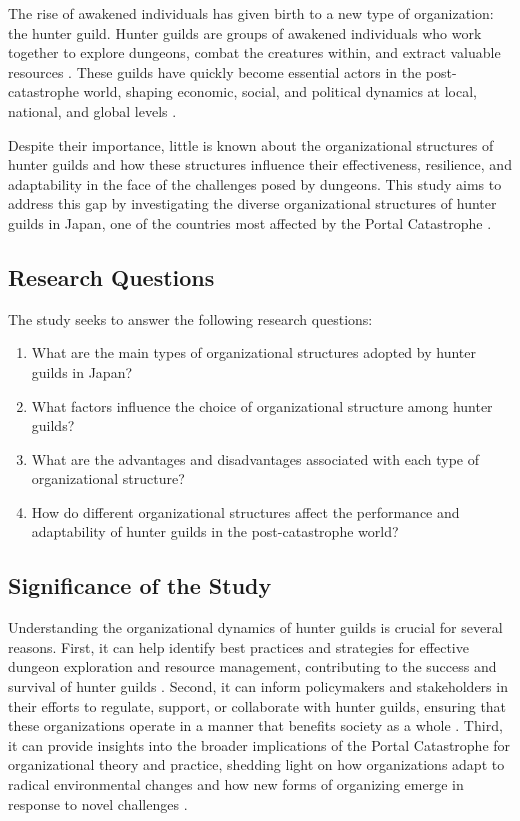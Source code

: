 \documentclass[12pt, a4paper]{article}
\begin{document}
The rise of awakened individuals has given birth to a new type of organization: the hunter guild. Hunter guilds are groups of awakened individuals who work together to explore dungeons, combat the creatures within, and extract valuable resources \cite{Sato2025}. These guilds have quickly become essential actors in the post-catastrophe world, shaping economic, social, and political dynamics at local, national, and global levels \cite{Watanabe2026}.

Despite their importance, little is known about the organizational structures of hunter guilds and how these structures influence their effectiveness, resilience, and adaptability in the face of the challenges posed by dungeons. This study aims to address this gap by investigating the diverse organizational structures of hunter guilds in Japan, one of the countries most affected by the Portal Catastrophe \cite{Mori2025}.

\subsection{Research Questions}
The study seeks to answer the following research questions:
\begin{enumerate}
    \item What are the main types of organizational structures adopted by hunter guilds in Japan?
    \item What factors influence the choice of organizational structure among hunter guilds?
    \item What are the advantages and disadvantages associated with each type of organizational structure?
    \item How do different organizational structures affect the performance and adaptability of hunter guilds in the post-catastrophe world?
\end{enumerate}

\subsection{Significance of the Study}
Understanding the organizational dynamics of hunter guilds is crucial for several reasons. First, it can help identify best practices and strategies for effective dungeon exploration and resource management, contributing to the success and survival of hunter guilds \cite{Nakamura2025}. Second, it can inform policymakers and stakeholders in their efforts to regulate, support, or collaborate with hunter guilds, ensuring that these organizations operate in a manner that benefits society as a whole \cite{Yoshida2025}. Third, it can provide insights into the broader implications of the Portal Catastrophe for organizational theory and practice, shedding light on how organizations adapt to radical environmental changes and how new forms of organizing emerge in response to novel challenges \cite{Takahashi2026}.
\end{document}
